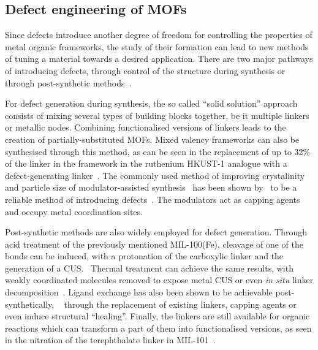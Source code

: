 \subsection{Defect engineering of MOFs}

Since defects introduce another degree of freedom
for controlling the properties of metal organic frameworks, the
study of their formation can lead to new methods of tuning
a material towards a desired application.
There are two major pathways of introducing defects, through
control of the structure during synthesis or through post-synthetic
methods~\cite{fangDefectEngineeredMetalOrganicFrameworks2015}.

For defect generation during synthesis, the so called
``solid solution'' approach consists of mixing several types of
building blocks together, be it multiple linkers or
metallic nodes. Combining functionalised versions of linkers
leads to the creation of partially-substituted \glspl{MOF}.
Mixed valency frameworks can also be synthesised through
this method, as can be seen in the replacement of up to 32\% of the
linker in the framework in the ruthenium HKUST-1
analogue with a defect-generating
linker~\cite{zhangRutheniumMetalOrganicFrameworks2016}.
The commonly used method of improving crystalinity and
particle size of modulator-assisted
synthesis~\cite{schaateModulatedSynthesisZrBased2011} has been shown
by~\citeauthor{shearerDefectEngineeringTuning2016}
to be a reliable method of introducing
defects~\cite{shearerDefectEngineeringTuning2016}.
The modulators act as capping agents and occupy metal coordination sites.

Post-synthetic methods are also widely employed for defect
generation. Through acid treatment of the previously mentioned
MIL-100(Fe), cleavage of one of the  bonds can be
induced, with a protonation of the carboxylic linker and the
generation of a \gls{CUS}.~\cite{vermoorteleTuningCatalyticPerformance2012}
Thermal treatment can achieve the same results, with weakly coordinated
molecules removed to expose metal \gls{CUS} or even \textit{in situ}
linker decomposition~\cite{gadipelliPostsynthesisAnnealingMOF52014}.
Ligand exchange has also been shown to be achievable post-synthetically,
~\cite{shearerFunctionalizingDefectsPostsynthetic2016} through the
replacement of existing linkers, capping agents or even induce
structural ``healing''. Finally, the linkers are still available 
for organic reactions which can transform a part of them into
functionalised versions, as seen in the nitration of the 
terephthalate linker in MIL-101~\cite{berntDirectCovalentPostsynthetic2011}.

